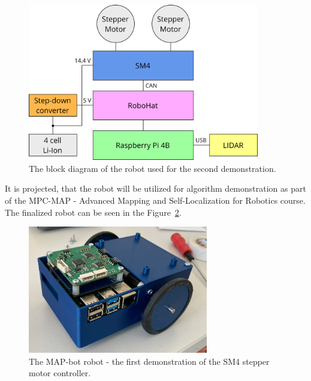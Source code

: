 \begin{figure}[H]
    \centering
    \includegraphics[width=0.9\textwidth]{obrazky/mapbot_block_diag}
    \caption{The block diagram of the robot used for the second demonstration.}
    \label{fig:mapbot_block}
\end{figure}

It is projected, that the robot will be utilized for algorithm demonstration as part of the MPC-MAP - Advanced Mapping and Self-Localization for Robotics course.
The finalized robot can be seen in the Figure~\ref{fig:map_bot}.

\begin{figure}[H]
    \centering
    \includegraphics[width=0.7\textwidth]{obrazky/map_bot}
    \caption{The MAP-bot robot - the first demonstration of the SM4 stepper motor controller.}
    \label{fig:map_bot}
\end{figure}
